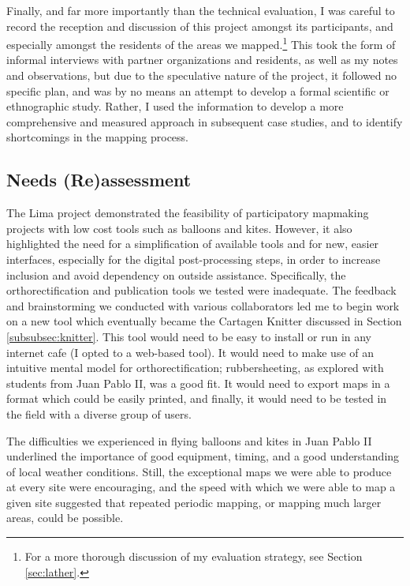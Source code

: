 \documentclass[11pt,oneside,notitlepage]{report}
\begin{document}
{{Finally, and far more importantly than the technical evaluation, I was careful to record the reception and discussion of this project amongst its participants, and especially amongst the residents of the areas we mapped.\footnote{For a more thorough discussion of my evaluation strategy, see Section \ref{sec:lather}.} This took the form of informal interviews with partner organizations and residents, as well as my notes and observations, but due to the speculative nature of the project, it followed no specific plan, and was by no means an attempt to develop a formal scientific or ethnographic study. Rather, I used the information to develop a more comprehensive and measured approach in subsequent case studies, and to identify shortcomings in the mapping process. 

\subsection{Needs (Re)assessment}

The Lima project demonstrated the feasibility of participatory mapmaking projects with low cost tools such as balloons and kites. However, it also highlighted the need for a simplification of available tools and for new, easier interfaces, especially for the digital post-processing steps, in order to increase inclusion and avoid dependency on outside assistance. Specifically, the orthorectification and publication tools we tested were inadequate. The feedback and brainstorming we conducted with various collaborators led me to begin work on a new tool which eventually became the Cartagen Knitter discussed in Section \ref{subsubsec:knitter}. This tool would need to be easy to install or run in any internet cafe (I opted to a web-based tool). It would need to make use of an intuitive mental model for orthorectification; rubbersheeting, as explored with students from Juan Pablo II, was a good fit. It would need to export maps in a format which could be easily printed, and finally, it would need to be tested in the field with a diverse group of users. 

The difficulties we experienced in flying balloons and kites in Juan Pablo II underlined the importance of good equipment, timing, and a good understanding of local weather conditions. Still, the exceptional maps we were able to produce at every site were encouraging, and the speed with which we were able to map a given site suggested that repeated periodic mapping, or mapping much larger areas, could be possible. 

}}
\end{document}
